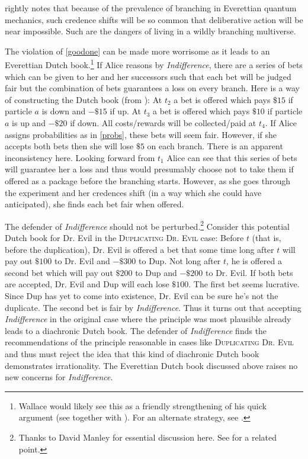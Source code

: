 \documentclass[12pt,onecolumn,secnumarabic,amsmath,amssymb,balancelastpage,nofootinbib]{article}
\begin{document}
\citet[]{wallace2012} rightly notes that because of the prevalence of branching in Everettian quantum mechanics, such credence shifts will be so common that deliberative action will be near impossible.  Such are the dangers of living in a wildly branching multiverse.

The violation of \eqref{goodone} can be made more worrisome as it leads to an Everettian Dutch book.\footnote{Wallace would likely see this as a friendly strengthening of his quick argument (see \citealp[]{wallace2012} together with \citealp[p. 247]{wallace2010xi}). For an alternate strategy, see \citep[\textsection II]{wallace2010xi}.}  If Alice reasons by \emph{Indifference}, there are a series of bets which can be given to her and her successors such that each bet will be judged fair but the combination of bets guarantees a loss on every branch.  Here is a way of constructing the Dutch book (from \citealp[]{peterson}):  At $t_2$ a bet is offered which pays $\$15$ if particle $a$ is down and $-\$15$ if up.  At $t_3$ a bet is offered which pays $\$10$ if particle $a$ is up and $-\$20$ if down.  All costs/rewards will be collected/paid at $t_4$.  If Alice assigns probabilities as in \eqref{probs}, these bets will seem fair.  However, if she accepts both bets then she will lose $\$5$ on each branch.  There is an apparent inconsistency here.  Looking forward from $t_1$ Alice can see that this series of bets will guarantee her a loss and thus would presumably choose not to take them if offered as a package before the branching starts.  However, as she goes through the experiment and her credences shift (in a way which she could have anticipated), she finds each bet fair when offered.

The defender of \emph{Indifference} should not be perturbed.\footnote{Thanks to David Manley for essential discussion here.  See \citep{lewis2009} for a related point.}  Consider this potential Dutch book for Dr. Evil in the \textsc{Duplicating Dr. Evil} case: Before $t$ (that is, before the duplication), Dr. Evil is offered a bet that some time long after $t$ will pay out $\$100$ to Dr. Evil and $-\$300$ to Dup.  Not long after $t$, he is offered a second bet which will pay out $\$200$ to Dup and $-\$200$ to Dr. Evil.  If both bets are accepted, Dr. Evil and Dup will each lose $\$100$.  The first bet seems lucrative.  Since Dup has yet to come into existence, Dr. Evil can be sure he's not the duplicate.  The second bet is fair by \emph{Indifference}.  Thus it turns out that accepting \textit{Indifference} in the original case where the principle was most plausible already leads to a diachronic Dutch book.  The defender of \emph{Indifference} finds the recommendations of the principle reasonable in cases like \textsc{Duplicating Dr. Evil} and thus must reject the idea that this kind of diachronic Dutch book demonstrates irrationality.  The Everettian Dutch book discussed above raises no new concerns for \emph{Indifference}.
\end{document}
